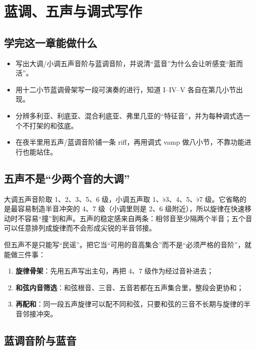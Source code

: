 \clearpage
\chapter{蓝调、五声与调式写作}
\label{chap:blues-pentatonic-modal}


\section*{学完这一章能做什么}
\begin{itemize}
  \item 写出大调/小调五声音阶与蓝调音阶，并说清“蓝音”为什么会让听感变“脏而活”。
  \item 用十二小节蓝调骨架写一段可演奏的进行，知道 I--IV--V 各自在第几小节出现。
  \item 分辨多利亚、利底亚、混合利底亚、弗里几亚的“特征音”，并为每种调式选一个不打架的和弦底。
  \item 在夜半里用五声/蓝调音阶铺一条 riff，再用调式 vamp 做八小节，不靠功能进行也能站住。
\end{itemize}

\section{五声不是“少两个音的大调”}

大调五声音阶取 1、2、3、5、6 级，小调五声取 1、\(\flat\)3、4、5、\(\flat\)7 级。它省略的是最容易制造半音冲突的 4、7 级（小调里则是 2、6 级附近），所以旋律在快速移动时不容易“撞”到和声。五声的稳定感来自两条：相邻音至少隔两个半音；五个音可以任意排列成旋律而不会形成尖锐的半音邻接。

但五声不是只能写“民谣”。把它当“可用的音高集合”而不是“必须严格的音阶”，就能做三件事：

\begin{enumerate}
  \item \textbf{旋律骨架}：先用五声写出主句，再把 4、7 级作为经过音补进去；
  \item \textbf{和弦内音筛选}：和弦根音、三音、五音若都在五声集合里，整段会更协和；
  \item \textbf{再配和}：同一段五声旋律可以配不同和弦，只要和弦的三音不长期与旋律的半音邻接冲突。
\end{enumerate}

\section{蓝调音阶与蓝音}

